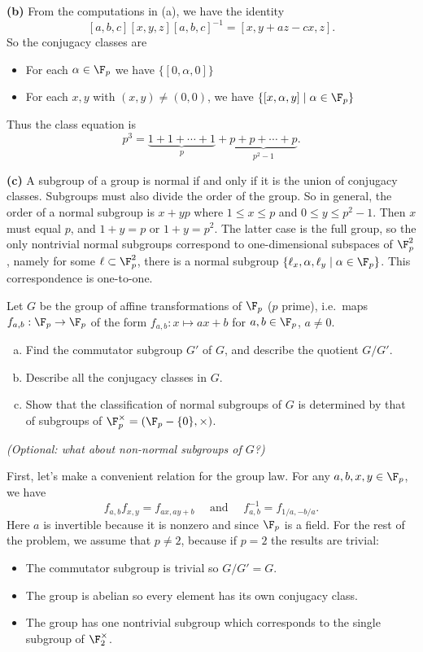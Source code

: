 \documentclass[11pt,letterpaper]{article}
\begin{document}
\textbf{(b)} From the computations in (a), we have the identity
\[
  [a,b,c][x,y,z][a,b,c]^{-1}=[x,y+az-cx,z]
.\]
So the conjugacy classes are 
\begin{itemize}
  \item For each $\alpha\in \F_p$ we have $\{[0,\alpha,0]\}$
  \item For each $x,y$ with $(x,y)\neq (0,0)$, we have $\{ [x,\alpha,y] \mid \alpha\in \F_p\}$   
\end{itemize} 
Thus the class equation is
\[
  p^3=\underbrace{1+1+\cdots+1}_{p}+\underbrace{p+p+\cdots+p}_{p^2-1}
.\] 

\textbf{(c)} A subgroup of a group is normal if and only if it is the union of conjugacy classes. Subgroups must also divide the order of the group. So in general, the order of a normal subgroup is $x+yp$ where $1\leq x\leq p$ and $0\leq y\leq p^2-1$. Then $x$ must equal $p$, and $1+y=p$ or $1+y=p^2$. The latter case is the full group, so the only nontrivial normal subgroups correspond to one-dimensional subspaces of $\F_p^2$, namely for some $\ell\subset \F_p^2$, there is a normal subgroup $\{\ell_x, \alpha, \ell_y \mid \alpha\in \F_p\}$. This correspondence is one-to-one.  

\pagebreak
\begin{problem}
Let $G$ be the group of affine transformations of $\F_p$ ($p$
prime), i.e.\ maps $f_{a,b}:\F_p\to \F_p$ of the form $f_{a,b}:x\mapsto
ax+b$ for $a,b\in \F_p$, $a\neq 0$.
\begin{enumerate}[(a)]
  \item Find the commutator subgroup $G'$ of $G$, and describe the quotient $G/G'$.
  \item Describe all the conjugacy classes in $G$.
  \item Show that the classification of normal subgroups of $G$ is determined
  by that of subgroups of $\F_p^\times=(\F_p-\{0\},\times)$.
\end{enumerate}
\end{problem}
\textit{(Optional: what about non-normal subgroups of $G$?)}

First, let's make a convenient relation for the group law. For any $a,b,x,y\in \F_p$, we have 
\[
  f_{a,b}f_{x,y}=f_{ax, ay+b}\quad\textrm{ and }\quad f_{a,b}^{-1}=f_{1/a,-b/a}
.\]
Here $a$ is invertible because it is nonzero and since $\F_p$ is a field. For the rest of the problem, we assume that $p\neq 2$, because if $p=2$ the results are trivial:
\begin{itemize}
  \item The commutator subgroup is trivial so $G/G'=G$.
  \item The group is abelian so every element has its own conjugacy class.
  \item The group has one nontrivial subgroup which corresponds to the single subgroup of $\F_2^\times$.  
\end{itemize}  
\end{document}
